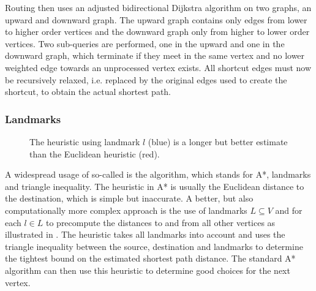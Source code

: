 			Routing then uses an adjusted bidirectional Dijkstra algorithm\cite[29-30]{geisberger-contraction-hierarchies} on two graphs, an upward and downward graph.
			The upward graph contains only edges from lower to higher order vertices and the downward graph only from higher to lower order vertices.
			Two sub-queries are performed, one in the upward and one in the downward graph, which terminate if they meet in the same vertex and no lower weighted edge towards an unprocessed vertex exists.
			All shortcut edges must now be recursively relaxed, i.e. replaced by the original edges used to create the shortcut, to obtain the actual shortest path.
		
		\subsubsection{Landmarks}
		\label{subsubsec:landmarks}
			
			\begin{figure}
				\vspace{-3\baselineskip}
				\begin{figcenter}
				\end{figcenter}
				\caption[Illustration of landmark heuristic.]{The heuristic using landmark $l$ (blue) is a longer but better estimate than the Euclidean heuristic (red).}
				\label{fig:landmarks}
			\end{figure}
			
			A widespread usage of so-called  is the  algorithm, which stands for A*, landmarks and triangle inequality\cite{goldberg-landmarks}.
			The heuristic in A* is usually the Euclidean distance to the destination, which is simple but inaccurate.
			A better, but also computationally more complex approach is the use of landmarks $L \subseteq V$ and for each $l \in L$ to precompute the distances to and from all other vertices as illustrated in .
			The heuristic takes all landmarks into account and uses the triangle inequality between the source, destination and landmarks to determine the tightest bound on the estimated shortest path distance.
			The standard A* algorithm can then use this heuristic to determine good choices for the next vertex.
		
